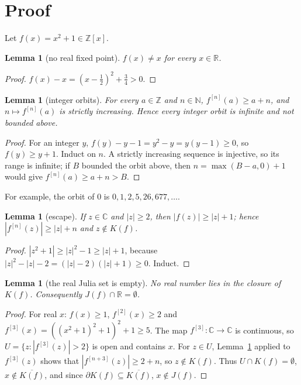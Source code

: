 \documentclass[11pt]{article}
\renewcommand{\_}{\oldus\allowbreak}
\newtheorem{lemma}[theorem]{Lemma}
\theoremstyle{definition}
\theoremstyle{remark}
\newcommand{\Z}{\mathbb{Z}}
\newcommand{\R}{\mathbb{R}}
\newcommand{\C}{\mathbb{C}}
\newcommand{\N}{\mathbb{N}}
\begin{document}
\section{Proof}

Let $f(x) = x^2 + 1 \in \Z[x]$.

\begin{lemma}[no real fixed point]\label{lem:fix}
$f(x) \ne x$ for every $x \in \R$.
\end{lemma}
\begin{proof}
$f(x) - x = (x - \tfrac12)^2 + \tfrac34 > 0$.
\end{proof}

\begin{lemma}[integer orbits]\label{lem:orbit}
For every $a \in \Z$ and $n \in \N$, $f^{[n]}(a) \ge a + n$, and $n \mapsto f^{[n]}(a)$ is strictly
increasing. Hence every integer orbit is infinite and not bounded above.
\end{lemma}
\begin{proof}
For an integer $y$, $f(y) - y - 1 = y^2 - y = y(y-1) \ge 0$, so $f(y) \ge y + 1$. Induct on $n$.
A strictly increasing sequence is injective, so its range is infinite; if $B$ bounded the orbit above,
then $n = \max(B - a, 0) + 1$ would give $f^{[n]}(a) \ge a + n > B$.
\end{proof}

For example, the orbit of $0$ is $0, 1, 2, 5, 26, 677, \dots$.

\begin{lemma}[escape]\label{lem:escape}
If $z \in \C$ and $|z| \ge 2$, then $|f(z)| \ge |z| + 1$; hence $|f^{[n]}(z)| \ge |z| + n$ and $z \notin K(f)$.
\end{lemma}
\begin{proof}
$|z^2 + 1| \ge |z|^2 - 1 \ge |z| + 1$, because $|z|^2 - |z| - 2 = (|z|-2)(|z|+1) \ge 0$. Induct.
\end{proof}

\begin{lemma}[the real Julia set is empty]\label{lem:julia}
No real number lies in the closure of $K(f)$. Consequently $J(f) \cap \R = \emptyset$.
\end{lemma}
\begin{proof}
For real $x$: $f(x) \ge 1$, $f^{[2]}(x) \ge 2$ and $f^{[3]}(x) = ((x^2+1)^2+1)^2+1 \ge 5$. The map
$f^{[3]} : \C \to \C$ is continuous, so $U = \{z : |f^{[3]}(z)| > 2\}$ is open and contains $x$. For
$z \in U$, Lemma~\ref{lem:escape} applied to $f^{[3]}(z)$ shows that $|f^{[n+3]}(z)| \ge 2 + n$, so $z
\notin K(f)$. Thus $U \cap K(f) = \emptyset$, $x \notin \overline{K(f)}$, and since $\partial K(f)
\subseteq \overline{K(f)}$, $x \notin J(f)$.
\end{proof}
\end{document}
